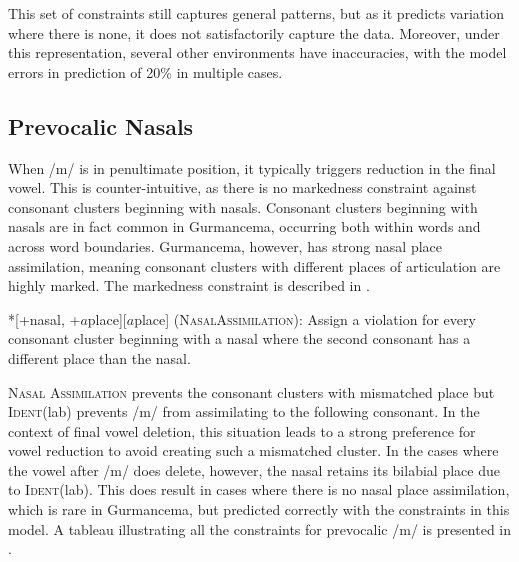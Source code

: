 \documentclass[output=paper,newtxmath,modfonts,nonflat,draftmode]{langsci/langscibook}
\begin{document}
This set of constraints still captures general patterns, but as it predicts variation where there is none, it does not satisfactorily capture the data. Moreover, under this representation, several other environments have inaccuracies, with the model errors in prediction of 20\% in multiple cases. 

\subsection{Prevocalic Nasals}

When /m/ is in penultimate position, it typically triggers reduction in the final vowel. This is counter-intuitive, as there is no markedness constraint against consonant clusters beginning with nasals. Consonant clusters beginning with nasals are in fact common in Gurmancema, occurring both within words and across word boundaries. Gurmancema, however, has strong nasal place assimilation, meaning consonant clusters with different places of articulation are highly marked. The markedness constraint is described in .

\ea\label{ex:baird:16}
*[+nasal, +$a$place][\textminus $a$place] (\textsc{NasalAssimilation}): Assign a violation for every 	consonant cluster beginning with a nasal where the second consonant has a 	different place than the nasal.
\z

\textsc{Nasal Assimilation} prevents the consonant clusters with mismatched place but \textsc{Ident}(lab) prevents /m/ from assimilating to the following consonant. In the context of final vowel deletion, this situation leads to a strong preference for vowel reduction to avoid creating such a mismatched cluster.  In the cases where the vowel after /m/ does delete, however, the nasal retains its bilabial place due to \textsc{Ident}(lab). This does result in cases where there is no nasal place assimilation, which is rare in Gurmancema, but predicted correctly with the constraints in this model. 
A tableau illustrating all the constraints for prevocalic /m/ is presented in . 
\end{document}
